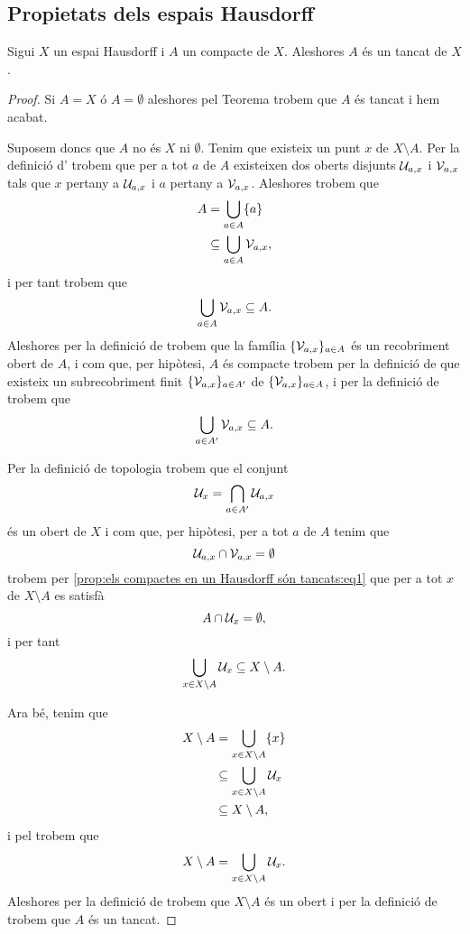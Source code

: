 \documentclass[../Apunts.tex]{subfiles}
\begin{document}
	\subsection{Propietats dels espais Hausdorff}
	\begin{proposition}
		\label{prop:els compactes en un Hausdorff són tancats}
		Sigui \(X\) un espai Hausdorff i \(A\) un compacte de \(X\). Aleshores \(A\) és un tancat de \(X\).
		\begin{proof} %
			Si \(A=X\) ó \(A=\emptyset\) aleshores pel Teorema  trobem que \(A\) és tancat i hem acabat.
			
			Suposem doncs que \(A\) no és \(X\) ni \(\emptyset\). Tenim que existeix un punt \(x\) de \(X\setminus A\). Per la definició d' trobem que per a tot \(a\) de \(A\) existeixen dos oberts disjunts \(\mathcal{U}_{a,x}\) i \(\mathcal{V}_{a,x}\) tals que \(x\) pertany a \(\mathcal{U}_{a,x}\) i \(a\) pertany a \(\mathcal{V}_{a,x}\). Aleshores trobem que
			\begin{align*}
				A&=\bigcup_{a\in A}\{a\} \\
				&\subseteq\bigcup_{a\in A}\mathcal{V}_{a,x},
			\end{align*}
			i per tant trobem que
			\[\bigcup_{a\in A}\mathcal{V}_{a,x}\subseteq A.\]
			Aleshores per la definició de  trobem que la família \(\{\mathcal{V}_{a,x}\}_{a\in A}\) és un recobriment obert de \(A\), i com que, per hipòtesi, \(A\) és compacte trobem per la definició de  que existeix un subrecobriment finit \(\{\mathcal{V}_{a,x}\}_{a\in A'}\) de \(\{\mathcal{V}_{a,x}\}_{a\in A}\), i per la definició de  trobem que
			\begin{equation}
				\label{prop:els compactes en un Hausdorff són tancats:eq1}
				\bigcup_{a\in A'}\mathcal{V}_{a,x}\subseteq A.
			\end{equation}
			
			Per la definició de topologia trobem que el conjunt
			\[\mathcal{U}_{x}=\bigcap_{a\in A'}\mathcal{U}_{a,x}\]
			és un obert de \(X\) i com que, per hipòtesi, per a tot \(a\) de \(A\) tenim que
			\[\mathcal{U}_{a,x}\cap\mathcal{V}_{a,x}=\emptyset\]
			trobem per \eqref{prop:els compactes en un Hausdorff són tancats:eq1} que per a tot \(x\) de \(X\setminus A\) es satisfà
			\[A\cap\mathcal{U}_{x}=\emptyset,\]
			i per tant
			\[\bigcup_{x\in X\setminus A}\mathcal{U}_{x}\subseteq X\setminus A.\]
			
			Ara bé, tenim que
			\begin{align*}
				X\setminus A&=\bigcup_{x\in X\setminus A}\{x\} \\
				&\subseteq\bigcup_{x\in X\setminus A}\mathcal{U}_{x} \\
				&\subseteq X\setminus A,
			\end{align*}
			i pel  trobem que
			\[X\setminus A=\bigcup_{x\in X\setminus A}\mathcal{U}_{x}.\]
			Aleshores per la definició de  trobem que \(X\setminus A\) és un obert i per la definició de  trobem que \(A\) és un tancat.
		\end{proof}
	\end{proposition}
\end{document}
